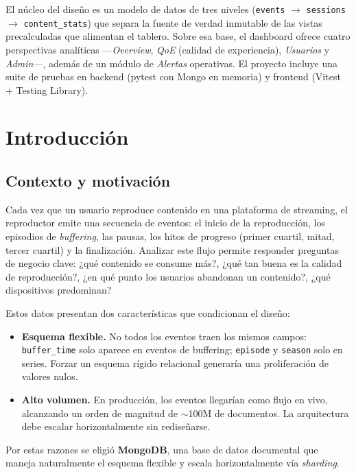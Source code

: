 \documentclass[12pt, letterpaper]{article}
\newcommand{\code}[1]{\texttt{#1}}
\begin{document}
El núcleo del diseño es un modelo de datos de tres niveles
(\code{events} $\rightarrow$ \code{sessions} $\rightarrow$ \code{content\_stats})
que separa la fuente de verdad inmutable de las vistas precalculadas que
alimentan el tablero. Sobre esa base, el dashboard ofrece cuatro perspectivas
analíticas —\emph{Overview}, \emph{QoE} (calidad de experiencia),
\emph{Usuarios} y \emph{Admin}—, además de un módulo de \emph{Alertas}
operativas. El proyecto incluye una suite de pruebas en backend (pytest con
Mongo en memoria) y frontend (Vitest + Testing Library).

\section{Introducción}
\subsection{Contexto y motivación}
Cada vez que un usuario reproduce contenido en una plataforma de streaming, el
reproductor emite una secuencia de eventos: el inicio de la reproducción, los
episodios de \emph{buffering}, las pausas, los hitos de progreso (primer
cuartil, mitad, tercer cuartil) y la finalización. Analizar este flujo permite
responder preguntas de negocio clave: ¿qué contenido se consume más?,
¿qué tan buena es la calidad de reproducción?, ¿en qué punto los usuarios
abandonan un contenido?, ¿qué dispositivos predominan?

Estos datos presentan dos características que condicionan el diseño:

\begin{itemize}[leftmargin=*]
  \item \textbf{Esquema flexible.} No todos los eventos traen los mismos campos:
        \code{buffer\_time} solo aparece en eventos de buffering;
        \code{episode} y \code{season} solo en series. Forzar un esquema rígido
        relacional generaría una proliferación de valores nulos.
  \item \textbf{Alto volumen.} En producción, los eventos llegarían como flujo
        en vivo, alcanzando un orden de magnitud de $\sim$100M de documentos.
        La arquitectura debe escalar horizontalmente sin rediseñarse.
\end{itemize}

Por estas razones se eligió \textbf{MongoDB}, una base de datos documental que
maneja naturalmente el esquema flexible y escala horizontalmente vía
\emph{sharding}.
\end{document}
